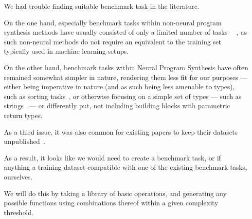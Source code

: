 \documentclass{article}
\begin{document}

We had trouble finding suitable benchmark task in the literature.

On the one hand, especially benchmark tasks within non-neural program synthesis methods have usually consisted of only a limited number of tasks%
~\citep{myth,lambda2,typedmil,houdini,tamandu,dilp}~\cite{terpret},
as such non-neural methods do not require an equivalent to the training set typically used in machine learning setups.

On the other hand, benchmark tasks within Neural Program Synthesis have often remained somewhat simpler in nature,
rendering them less fit for our purposes --- either being imperative in nature (and as such being less amenable to types),
such as sorting tasks~\citep{npi,alphanpi},
or otherwise focusing on a simple set of types --- such as strings~\citep{nsps} ---%
or differently put, not including building blocks with parametric return types.

As a third issue, it was also common for existing papers to keep their datasets unpublished~\citep{nsps,deepcoder,tamandu}.

As a result, it looks like we would need to create a benchmark task, or if anything a training dataset compatible with one of the existing benchmark tasks, ourselves.

We will do this by taking a library of basic operations, and generating any possible functions using combinations thereof within a given complexity threshold.

\end{document}
